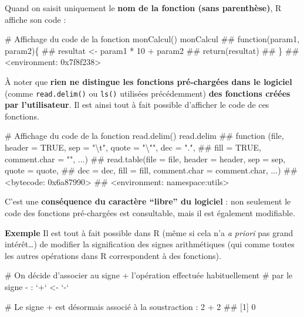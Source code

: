\documentclass[12pt,twosided, notitlepage]{book}
\newenvironment{Shaded}{}{}
\newcommand{\DataTypeTok}[1]{{#1}}
\newcommand{\DecValTok}[1]{{#1}}
\newcommand{\StringTok}[1]{\textcolor[rgb]{0.00,0.50,0.50}{{#1}}}
\newcommand{\CommentTok}[1]{\textcolor[rgb]{0.00,0.50,0.00}{{#1}}}
\newcommand{\NormalTok}[1]{{#1}}
\renewenvironment{Shaded}{\begin{snugshade}}{\end{snugshade}}
\begin{document}
Quand on saisit uniquement le \textbf{nom de la fonction (sans
parenthèse)}, R affiche son code :

\begin{Shaded}
\begin{Highlighting}[]
\CommentTok{# Affichage du code de la fonction monCalcul()}
\NormalTok{monCalcul}
  \NormalTok{## function(param1, param2)\{}
  \NormalTok{##   resultat <- param1 * 10 + param2}
  \NormalTok{##   return(resultat)}
  \NormalTok{## \}}
  \NormalTok{## <environment: 0x7f8f238>}
\end{Highlighting}
\end{Shaded}

À noter que \textbf{rien ne distingue les fonctions pré-chargées dans le
logiciel} (comme \texttt{read.delim()} ou \texttt{ls()} utilisées
précédemment) \textbf{des fonctions créées par l'utilisateur}. Il est
ainsi tout à fait possible d'afficher le code de ces
fonctions.

\begin{Shaded}
\begin{Highlighting}[]
\CommentTok{# Affichage du code de la fonction read.delim()}
\NormalTok{read.delim}
  \NormalTok{## function (file, header = TRUE, sep = "\textbackslash{}t", quote = "\textbackslash{}"", dec = ".", }
  \NormalTok{##     fill = TRUE, comment.char = "", ...) }
  \NormalTok{## read.table(file = file, header = header, sep = sep, quote = quote, }
  \NormalTok{##     dec = dec, fill = fill, comment.char = comment.char, ...)}
  \NormalTok{## <bytecode: 0x6a87990>}
  \NormalTok{## <environment: namespace:utils>}
\end{Highlighting}
\end{Shaded}

C'est une \textbf{conséquence du caractère \enquote{libre} du logiciel}
: non seulement le code des fonctions pré-chargées est consultable, mais
il est également modifiable.

\textbf{Exemple} Il est tout à fait possible dans R (même si cela n'a
\emph{a priori} pas grand intérêt\ldots{}) de modifier la signification
des signes arithmétiques (qui comme toutes les autres opérations dans R
correspondent à des fonctions).

\begin{Shaded}
\begin{Highlighting}[]
\CommentTok{# On décide d'associer au signe + l'opération effectuée habituellement }
\CommentTok{# par le signe - :}
\StringTok{`}\DataTypeTok{+}\StringTok{`} \NormalTok{<-}\StringTok{ `}\DataTypeTok{-}\StringTok{`}

\CommentTok{# Le signe + est désormais associé à la soustraction :}
\DecValTok{2} \NormalTok{+}\StringTok{ }\DecValTok{2}
  \NormalTok{## [1] 0}
\end{Highlighting}
\end{Shaded}
\end{document}
